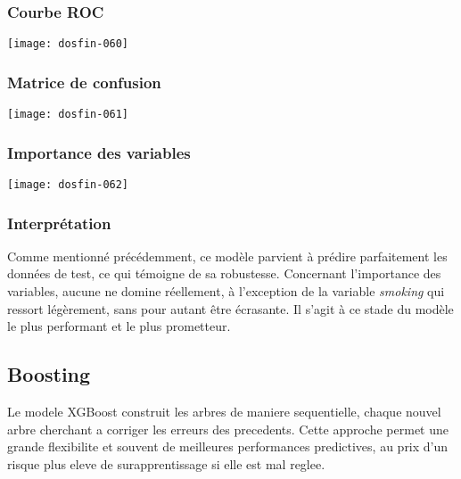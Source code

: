 \documentclass[a4paper,11pt]{article}
\begin{document}
\subsubsection{Courbe ROC}

\begin{center}

\texttt{[image: dosfin-060]}

\end{center}

\subsubsection{Matrice de confusion}

\begin{center}

\texttt{[image: dosfin-061]}

\end{center}


\subsubsection{Importance des variables}

\begin{center}

\texttt{[image: dosfin-062]}

\end{center}

\subsubsection{Interprétation}

Comme mentionné précédemment, ce modèle parvient à prédire parfaitement les données de test, ce qui témoigne de sa robustesse.  
Concernant l’importance des variables, aucune ne domine réellement, à l’exception de la variable \textit{smoking} qui ressort légèrement, sans pour autant être écrasante.  
Il s’agit à ce stade du modèle le plus performant et le plus prometteur.

\newpage

\subsection{Boosting}

Le modele XGBoost construit les arbres de maniere sequentielle, chaque nouvel arbre cherchant a corriger les erreurs des precedents.  
Cette approche permet une grande flexibilite et souvent de meilleures performances predictives, au prix d’un risque plus eleve de surapprentissage si elle est mal reglee.
\end{document}
